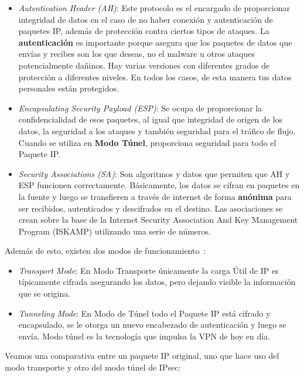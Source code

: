 \begin{itemize}
	\item \textit{Autentication Header (AH)}: Este protocolo es el encargado de proporcionar integridad de datos en el caso de no haber conexión y autenticación de paquetes IP, además de protección contra ciertos tipos de ataques. 
	La \textbf{autenticación} es importante porque asegura que los paquetes de datos que envías y recibes son los que deseas, no el malware u otros ataques potencialmente dañinos. Hay varias versiones con diferentes grados de protección a diferentes niveles. En todos los casos, de esta manera tus datos personales están protegidos.
		
 	\item \textit{Encapsulating Security Payload (ESP)}: Se ocupa de proporcionar la confidencialidad de esos paquetes, al igual que integridad de origen de los datos, la seguridad a los ataques y también seguridad para el tráfico de flujo. Cuando se utiliza en \textbf{Modo Túnel}, proporciona seguridad para todo el Paquete IP.
 	
	\item \textit{Security Associations (SA)}: Son algoritmos y datos que permiten que AH y ESP funcionen correctamente. 
	Básicamente, los datos se cifran en paquetes en la fuente y luego se transfieren a través de internet de forma \textbf{anónima} para ser recibidos, autenticados y descifrados en el destino. Las asociaciones se crean sobre la base de la Internet Security Association And Key Management Program (ISKAMP) utilizando una serie de números.
\end{itemize}

Además de esto, existen dos modos de funcionamiento~\cite{article:ibm_ip}:

\begin{itemize}
	\item \textit{Transport Mode}: En Modo Transporte únicamente la carga Útil de IP es típicamente cifrada asegurando los datos, pero dejando visible la información que se origina.
	
	\item \textit{Tunneling Mode}: En Modo de Túnel todo el Paquete IP está cifrado y encapsulado, se le otorga un nuevo encabezado de autenticación y luego se envía. Modo túnel es la tecnología que impulsa la VPN de hoy en día.
\end{itemize}

Veamos una comparativa entre un paquete IP original, uno que hace uso del modo transporte y otro del modo túnel de IPsec:

